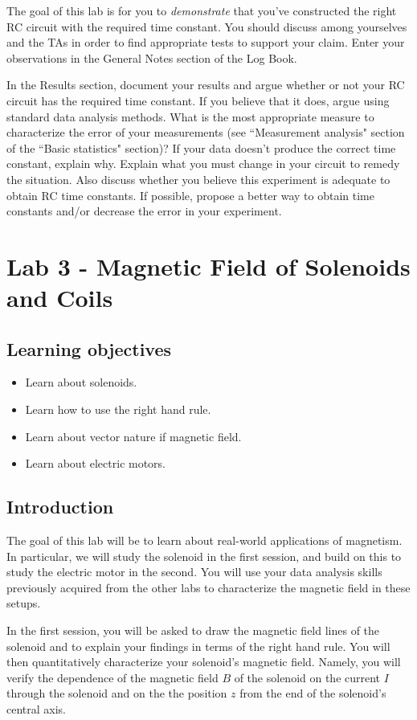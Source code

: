 \documentclass[12pt]{report}
\begin{document}
{\color{blue}The goal of this lab is for you to \textit{demonstrate} that you've constructed the right RC circuit with the required time constant. 
You should discuss among yourselves and the TAs in order to find appropriate tests to support your claim. Enter your observations in the General Notes section of the Log Book.}

{\color{blue}In the Results section, document your results and argue whether or not your RC circuit has the required time constant. If you believe that it does, argue using standard data analysis methods. What is the most appropriate measure to characterize the error of your measurements (see ``Measurement analysis" section of the ``Basic statistics" section)? If your data doesn't produce the correct time constant, explain why. Explain what you must change in your circuit to remedy the situation. Also discuss whether you believe this experiment is adequate to obtain RC time constants. If possible, propose a better way to obtain time constants and/or decrease the error in your experiment.}


\chapter{Lab 3 - Magnetic Field of Solenoids and Coils}
\section{Learning objectives}
\begin{itemize}
\item Learn about solenoids.
\item Learn how to use the right hand rule.
\item Learn about vector nature if magnetic field.
\item Learn about electric motors.
\end{itemize}

\section{Introduction}
The goal of this lab will be to learn about real-world applications of magnetism. In particular, we will study the solenoid in the first session, and build on this to study the electric motor in the second. You will use your data analysis skills previously acquired from the other labs to characterize the magnetic field in these setups.

In the first session, you will be asked to draw the magnetic field lines of the solenoid and to explain your findings in terms of the right hand rule. You will then quantitatively characterize your solenoid's magnetic field. Namely, you will verify the dependence of the magnetic field $B$ of the solenoid on the current $I$ through the solenoid and on the the position $z$ from the end of the solenoid's central axis.
\end{document}

